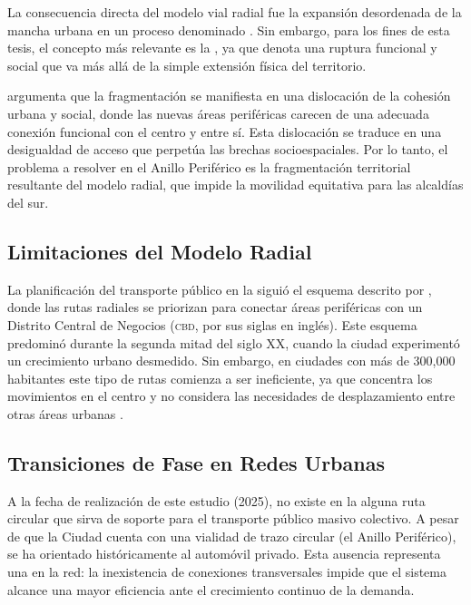 La consecuencia directa del modelo vial radial fue la expansión desordenada de la
mancha urbana en un proceso denominado . Sin embargo, para
los fines de esta tesis, el concepto más relevante es la , ya que denota una ruptura funcional y social que va más allá de la simple
extensión física del territorio.

\textcite{padilla2007} argumenta que la fragmentación se manifiesta en una dislocación
de la cohesión urbana y social, donde las nuevas áreas periféricas carecen de una
adecuada conexión funcional con el centro y entre sí. Esta dislocación se traduce en
una desigualdad de acceso que perpetúa las brechas socioespaciales. Por lo tanto,
el problema a resolver en el Anillo Periférico es la fragmentación territorial resultante
del modelo radial, que impide la movilidad equitativa para las alcaldías del sur.

\subsection{Limitaciones del Modelo Radial}
\label{subsec:limitaciones-radial}

La planificación del transporte público en la \cdmx{} siguió el esquema descrito por
\textcite{molinero2002}, donde las rutas radiales se priorizan para conectar áreas
periféricas con un Distrito Central de Negocios (\textsc{cbd}, por sus siglas en
inglés). Este esquema predominó durante la segunda mitad del siglo XX, cuando la
ciudad experimentó un crecimiento urbano desmedido. Sin embargo, en ciudades
con más de 300,000 habitantes este tipo de rutas comienza a ser ineficiente, ya que
concentra los movimientos en el centro y no considera las necesidades de
desplazamiento entre otras áreas urbanas \parencite{molinero2002}.

\subsection{Transiciones de Fase en Redes Urbanas}
\label{subsec:transiciones-fase}

A la fecha de realización de este estudio (2025), no existe en la \cdmx{} alguna ruta
circular que sirva de soporte para el transporte público masivo colectivo. A pesar de
que la Ciudad cuenta con una vialidad de trazo circular (el Anillo Periférico), \DIFdelbegin {}\DIFdelend \DIFaddbegin {}\DIFaddend se ha orientado históricamente al automóvil privado. Esta ausencia representa una
 en la red: la inexistencia de conexiones transversales
impide que el sistema alcance una mayor eficiencia ante el crecimiento continuo de
la demanda.

